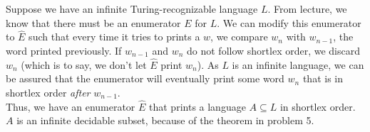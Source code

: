 \documentclass[11pt]{article}
\theoremstyle{definition}
\theoremstyle{case}
\theoremstyle{theorem}
\begin{document}
Suppose we have an infinite Turing-recognizable language $L$. From lecture, we know
that there must be an enumerator $E$ for $L$. We can modify this enumerator to $\hat{E}$
such that every time it tries to prints a $w$, we compare $w_n$ with $w_{n-1}$, the word 
printed previously. If $w_{n-1}$ and $w_{n}$ do not follow shortlex order, we discard
$w_{n}$ (which is to say, we don't let $\hat{E}$ print $w_{n}$). As $L$ is an infinite
language, we can be assured that the enumerator will eventually print some word $w_{n}$
that is in shortlex order \textit{after} $w_{n-1}$. \\

Thus, we have an enumerator $\hat{E}$ that prints a language $A \subseteq L$ in shortlex order.
$A$ is an infinite decidable subset, because of the theorem in problem 5.
\end{document}
